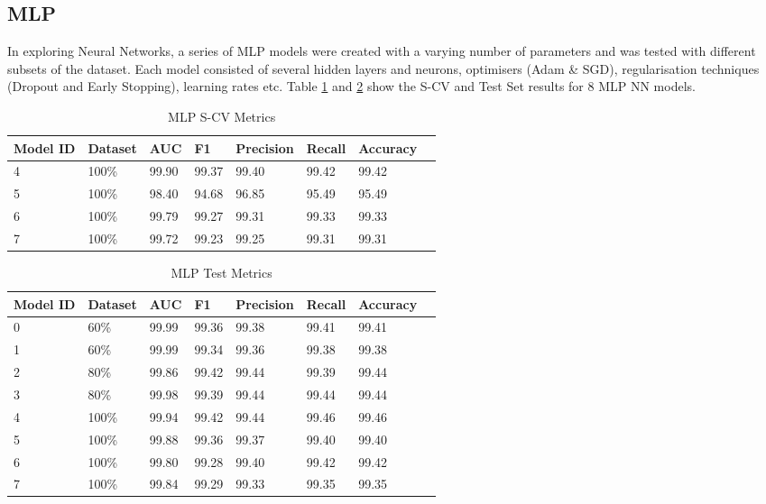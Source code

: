 \subsection{MLP}

In exploring Neural Networks, a series of MLP models were created with a varying number of parameters and was tested with different subsets of the dataset. Each model consisted of several hidden layers and neurons, optimisers (Adam \& SGD), regularisation techniques (Dropout and Early Stopping), learning rates etc. Table \ref{tab:mlp-scv-metrics} and \ref{tab:mlp-test-metrics} show the S-CV and Test Set results for 8 MLP NN models. 

\begin{table}[h]
\centering
\caption{MLP S-CV Metrics}
\label{tab:mlp-scv-metrics}
\begin{tabular}{|l|l|l|l|l|l|l|l|}
\hline
\textbf{Model ID} & \textbf{Dataset} & \textbf{AUC} & \textbf{F1} & \textbf{Precision} & \textbf{Recall} & \textbf{Accuracy}  \\ \hline
4 & 100\% & 99.90 & 99.37 & 99.40 & 99.42 & 99.42 \\ \hline
5 & 100\% & {\color{red} 98.40} & {\color{red} 94.68} & {\color{red} 96.85} & {\color{red} 95.49} & {\color{red} 95.49} \\ \hline
6 & 100\% & 99.79 & 99.27 & 99.31 & 99.33 & 99.33 \\ \hline
7 & 100\% & 99.72 & 99.23 & 99.25 & 99.31 & 99.31 \\ \hline

\end{tabular}
\end{table}

\begin{table}[H]
\centering
\caption{MLP Test Metrics}
\label{tab:mlp-test-metrics}
\begin{tabular}{|l|l|l|l|l|l|l|l|}
\hline
\textbf{Model ID} & \textbf{Dataset} & \textbf{AUC} & \textbf{F1} & \textbf{Precision} & \textbf{Recall} & \textbf{Accuracy}  \\ \hline
0 & 60\% & 99.99 & 99.36 & 99.38 & 99.41 & 99.41 \\ \hline
1 & 60\% & 99.99 & 99.34 & 99.36 & 99.38 & 99.38 \\ \hline
2 & 80\% & 99.86 & 99.42 & 99.44 & 99.39 & 99.44 \\ \hline
3 & 80\% & 99.98 & 99.39 & 99.44 & 99.44 & 99.44 \\ \hline
4 & 100\% & 99.94 & 99.42 & 99.44 & 99.46 & 99.46 \\ \hline
5 & 100\% & 99.88 & 99.36 & 99.37 & 99.40 & 99.40 \\ \hline
6 & 100\% & 99.80 & 99.28 & 99.40 & 99.42 & 99.42 \\ \hline
7 & 100\% & 99.84 & 99.29 & 99.33 & 99.35 & 99.35 \\ \hline
\end{tabular}
\end{table}


